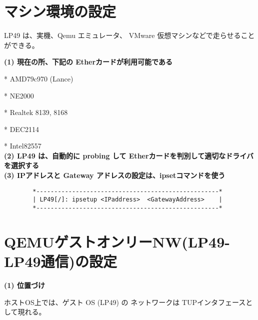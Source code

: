 \chapter{マシン環境の設定}

      LP49 は、実機、Qemu エミュレータ、 VMware 仮想マシンなどで走らせることができる。


{\bf (1) 現在の所、下記の Etherカードが利用可能である}

        * AMD79c970 (Lance)    

        * NE2000 

        * Realtek 8139, 8168

        * DEC2114

        * Intel82557
\\

{\bf  (2) LP49 は、自動的に probing して Etherカードを判別して適切なドライバを選択する}
\\

{\bf  (3) IPアドレスと Gateway アドレスの設定は、ipsetコマンドを使う}

\begin{verbatim}
        *---------------------------------------------------*      
        | LP49[/]: ipsetup <IPaddress>  <GatewayAddress>    |
        *---------------------------------------------------*           
\end{verbatim}

\chapter{QEMUゲストオンリーNW(LP49-LP49通信)の設定}

{\bf (1) 位置づけ}

        ホストOS上では、ゲスト OS (LP49) の ネットワークは TUPインタフェースとして現れる。

\begin{comment}
{\small
\begin{verbatim}
       *----- Host computer ---------------------*
       |                                         |      
       |  *- Guest OS --*     *- Guest OS---+    |       
       |  |             |     |             |    | 
       |  |    LP49     |     |    LP49     |    | 
       |  |             |     |             |    | 
       |  |-------------|     |-------------|    |                   
       |  |   Qemu      |     |   Qemu      |    | 
       |  *-------|-----*     *------|------*    |
       |          -------------------            |             
       |       (10.0.0.2)    (Ex. 10.0.0.5)      | 
       *-----------------------------------------*
\end{verbatim}
}    
\end{comment}


